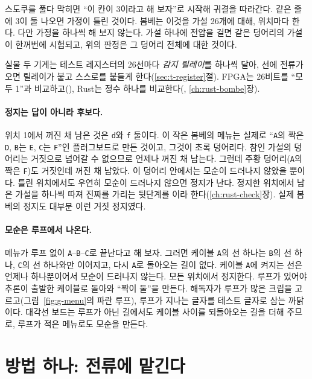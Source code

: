 \General 스도쿠를 풀다 막히면 ``이 칸이 3이라고 해 보자''로 시작해 귀결을 따라간다. 같은 줄에 3이 둘 나오면
가정이 틀린 것이다. 봄베는 이것을 가설 26개에 대해, 위치마다 한다. 다만 가정을 하나씩 해 보지 않는다. 가설 하나에
전압을 걸면 같은 덩어리의 가설이 한꺼번에 시험되고, 위의 판정은 그 덩어리 전체에 대한 것이다.

\Ours 실물 두 기계는 테스트 레지스터의 26선마다 \emph{감지 릴레이}를 하나씩 달아, 선에 전류가 오면 릴레이가 붙고
스스로를 붙들게 한다(\ref{sec:t-register}절). FPGA는 26비트를 ``모두 1''과 비교하고(), Rust는
정수 하나를 비교한다(, \ref{ch:rust-bombe}장).

\paragraph{정지는 답이 아니라 후보다.} 위치 1에서 꺼진 채 남은 것은 \texttt{d}와 \texttt{f} 둘이다. 이 작은 봄베의
메뉴는 실제로 ``\texttt{A}의 짝은 \texttt{D}, \texttt{B}는 \texttt{E}, \texttt{C}는 \texttt{F}''인 플러그보드로 만든
것이고, 그것이 초록 덩어리다. 참인 가설의 덩어리는 거짓으로 넘어갈 수 없으므로 언제나 꺼진 채 남는다. 그런데 주황
덩어리(\texttt{A}의 짝은 \texttt{F})도 거짓인데 꺼진 채 남았다. 이 덩어리 안에서는 모순이 드러나지 않았을 뿐이다.
틀린 위치에서도 우연히 모순이 드러나지 않으면 정지가 난다. 정지한 위치에서 남은 가설을 하나씩 따져 진짜를 가리는
뒷단계를 이라 한다(\ref{ch:rust-check}장). 실제 봄베의 정지도 대부분 이런 거짓 정지였다.

\paragraph{모순은 루프에서 나온다.} 메뉴가 루프 없이 \texttt{A}--\texttt{B}--\texttt{C}로 끝난다고 해 보자. 그러면
케이블 \texttt{A}의 선 하나는 \texttt{B}의 선 하나, \texttt{C}의 선 하나와만 이어지고, 다시 \texttt{A}로 돌아오는 길이
없다. 케이블 \texttt{A}에 켜지는 선은 언제나 하나뿐이어서 모순이 드러나지 않는다. 모든 위치에서 정지한다. 루프가
있어야 추론이 출발한 케이블로 돌아와 ``짝이 둘''을 만든다. 해독자가 루프가 많은 크립을 고르고(그림~\ref{fig:g-menu}의
파란 루프), 루프가 지나는 글자를 테스트 글자로 삼는 까닭이다. 대각선 보드는 루프가 아닌 길에서도 케이블 사이를
되돌아오는 길을 더해 주므로, 루프가 적은 메뉴로도 모순을 만든다.

\section{방법 하나: 전류에 맡긴다}\label{sec:f-current}

